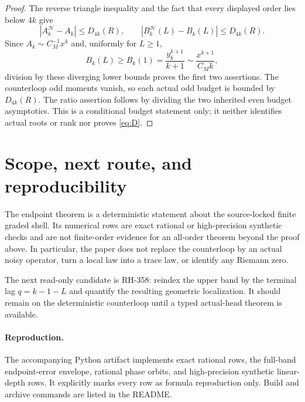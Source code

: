 \documentclass[11pt]{article}
\theoremstyle{remark}
\newcommand{\cH}{\mathcal H}
\begin{document}
\begin{proof}
The reverse triangle inequality and the fact that every displayed order lies
below $4k$ give
\[
 |A_k^{\cH}-A_k|\le D_{4k}(R),
 \qquad
 |B_k^{\cH}(L)-B_k(L)|\le D_{4k}(R).
\]
Since $A_k\sim C_M^{-1}x^k$ and, uniformly for $L\ge1$,
\[
 B_k(L)\ge B_k(1)=\frac{y_k^{k+1}}{k+1}
 \sim\frac{x^{k+1}}{C_M k},
\]
division by these diverging lower bounds proves the first two assertions.
The counterloop odd moments vanish, so each actual odd budget is bounded by
$D_{4k}(R)$.  The ratio assertion follows by dividing the two inherited even
budget asymptotics.  This is a conditional budget statement only; it neither
identifies actual roots or rank nor proves \eqref{eq:D}.
\end{proof}

\section{Scope, next route, and reproducibility}

The endpoint theorem is a deterministic statement about the source-locked
finite graded shell.  Its numerical rows are exact rational or high-precision
synthetic checks and are not finite-order evidence for an all-order theorem
beyond the proof above.  In particular, the paper does not replace the
counterloop by an actual noisy operator, turn a local law into a trace law,
or identify any Riemann zero.

The next read-only candidate is RH-358: reindex the upper band by the terminal
lag $q=k-1-L$ and quantify the resulting geometric localization.  It should
remain on the deterministic counterloop until a typed actual-head theorem is
available.

\paragraph{Reproduction.}
The accompanying Python artifact implements exact rational rows, the full-band
endpoint-error envelope, rational phase orbits, and high-precision synthetic
linear-depth rows.  It explicitly marks every row as formula reproduction only.
Build and archive commands are listed in the README.



\end{document}
